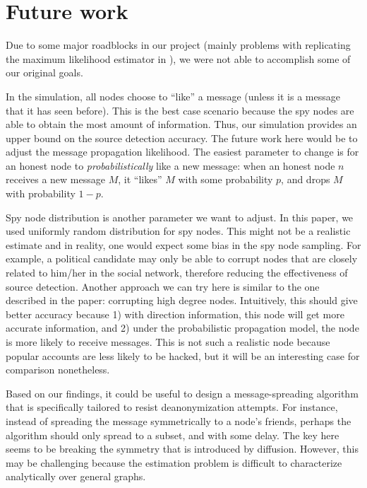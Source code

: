 \section{Future work}

Due to some major roadblocks in our project (mainly problems with replicating the maximum likelihood estimator in \cite{pinto}), we were not able to accomplish some of our original goals. 


In the simulation, all nodes choose to ``like'' a message (unless it is a message that it has seen before). This is the best case scenario because the spy nodes are able to obtain the most amount of information. Thus, our simulation provides an upper bound on the source detection accuracy. The future work here would be to adjust the message propagation likelihood. The easiest parameter to change is for an honest node to \emph{probabilistically} like a new message: when an honest node $n$ receives a new message $M$, it ``likes'' $M$ with some probability $p$, and drops $M$ with probability $1-p$.

Spy node distribution is another parameter we want to adjust. In this paper, we used uniformly random distribution for spy nodes. This might not be a realistic estimate and in reality, one would expect some bias in the spy node sampling. For example, a political candidate may only be able to corrupt nodes that are closely related to him/her in the social network, therefore reducing the effectiveness of source detection. Another approach we can try here is similar to the one described in the paper: corrupting high degree nodes. Intuitively, this should give better accuracy because 1) with direction information, this node will get more accurate information, and 2) under the probabilistic propagation model, the node is more likely to receive messages. This is not such a realistic node because popular accounts are less likely to be hacked, but it will be an interesting case for comparison nonetheless.

Based on our findings, it could be useful to design a message-spreading algorithm that is specifically tailored to resist deanonymization attempts. For instance, instead of spreading the message symmetrically to a node's friends, perhaps the algorithm should only spread to a subset, and with some delay. The key here seems to be breaking the symmetry that is introduced by diffusion. However, this may be challenging because the estimation problem is difficult to characterize analytically over general graphs.